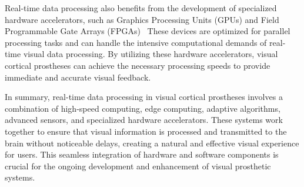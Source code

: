\documentclass[twocolumn,10pt]{article}
\begin{document}
Real-time data processing also benefits from the development of specialized
hardware accelerators, such as Graphics Processing Units (GPUs) and Field
Programmable Gate Arrays
(FPGAs)~\cite{springerOnDeviceDeepLearning2021,fengDesignOnlineBrainComputer2020}
These devices are optimized for parallel processing tasks and can handle the
intensive computational demands of real-time visual data processing. By
utilizing these hardware accelerators, visual cortical prostheses can achieve
the necessary processing speeds to provide immediate and accurate visual
feedback.

In summary, real-time data processing in visual cortical prostheses involves a
combination of high-speed computing, edge computing, adaptive algorithms,
advanced sensors, and specialized hardware accelerators. These systems work
together to ensure that visual information is processed and transmitted to the
brain without noticeable delays, creating a natural and effective visual
experience for users. This seamless integration of hardware and software
components is crucial for the ongoing development and enhancement of visual
prosthetic systems.
\end{document}

